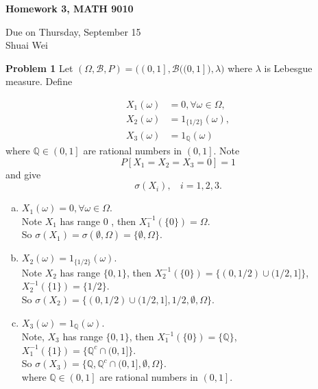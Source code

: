 \documentclass{article}
\newcommand{\llb}{\mathcal{B}}
\newcommand{\bbq}{\mathbb{Q}}
\begin{document}
\begin{center}

\textbf{Homework 3, MATH 9010}

Due on Thursday, September 15\\

Shuai Wei

\end{center}

\vspace{3 mm}

\noindent \textbf{Problem 1} Let $(\Omega, \llb, P) = \Big(\left(\left.0,1\right]\right.,\llb\big((\left. 0,1\right]\big),\lambda\Big)$ where $\lambda$ is Lebesgue measure. Define

\begin{align*}
	X_1(\omega) &= 0, \forall \omega \in \Omega,\\
	X_2(\omega) &= 1_{\{1/2\}}(\omega),\\
	X_3(\omega) &= 1_{\bbq}(\omega)
\end{align*}
where $\bbq \in \left(\left.0,1\right]\right.$ are rational numbers in $\left(\left.0,1\right]\right.$. Note 
$$ P[X_1 = X_2 = X_3 = 0] = 1$$
and give 
$$ \sigma(X_i),~~~~	i = 1,2,3.$$

\begin{enumerate}[(a)]
	\item
		$X_1(\omega) = 0, \forall \omega \in \Omega$.\\
		Note $X_1$ has range  0 , then $X^{-1}_{1}(\{0\}) = \Omega$.\\
		So $\sigma(X_1) = \sigma(\emptyset, \Omega)= \{\emptyset, \Omega\}$.\\
	\item 
		$X_2(\omega) = 1_{\{1/2\}}(\omega)$.\\
	Note $X_2$ has range $\{0,1\}$, then $X^{-1}_2(\{0\}) = \{(0,1/2)\cup (1/2,1]\}$,$X^{-1}_2(\{1\}) = \{1/2\}$. \\
	So $\sigma(X_2) = \{(0,1/2)\cup (1/2,1], 1/2, \emptyset, \Omega\}$.
	\item
	$X_3(\omega) = 1_{\bbq}(\omega)$.\\
	Note, $X_3$ has range $\{0,1\}$, then $X^{-1}_1(\{0\}) = \{\bbq\}$, $X^{-1}_1(\{1\}) = \{\bbq^c \cap (0,1]\}$.\\
	So $\sigma(X_3) = \{\bbq, \bbq^c \cap (0,1], \emptyset, \Omega\}$.\\
	where $\bbq \in \left(\left.0,1\right]\right.$ are rational numbers in $\left(\left.0,1\right]\right.$.
\end{enumerate}
\end{document}
